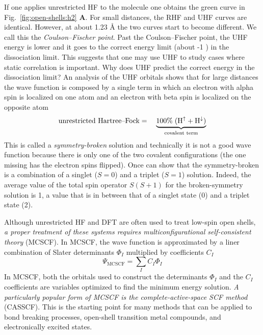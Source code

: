 \documentclass[../Main/notes.tex]{subfiles}
\begin{document}
If one applies unrestricted HF to the  molecule one obtains the green curve in Fig.~\ref{fig:open-shells:h2} \textbf{A}.
For small  distances, the RHF and UHF curves are identical.
However, at about 1.23 \AA{} the two curves start to become different.
We call this the \emph{Coulson--Fischer point}.
Past the Coulson--Fischer point, the UHF energy is lower and it goes to the correct energy limit (about -1 \Eh) in the dissociation limit.
This suggests that one may use UHF to study cases where static correlation is important.
Why does UHF predict the correct energy in the dissociation limit?
An analysis of the UHF orbitals shows that for large  distances the wave function is composed by a single term in which an electron with alpha spin is localized on one atom and an electron with beta spin is localized on the opposite atom 
\begin{equation}
\text{unrestricted Hartree--Fock} = \quad \underbrace{100\% \; (\ce{H}^{\uparrow} + \ce{H}^{\downarrow}) }_{\text{covalent term}}
\end{equation}
This is called a \emph{symmetry-broken} solution and technically it is not a good wave function because there is only one of the two covalent configurations (the one missing has the electron spins flipped).
Once can show that the symmetry-broken is a combination of a singlet ($S = 0$) and a triplet ($S = 1$) solution.
Indeed, the average value of the total spin operator $S(S+1)$ for the broken-symmetry solution is 1, a value that is in between that of a singlet state (0) and a triplet state (2).

Although unrestricted HF and DFT are often used to treat low-spin open shells, \emph{a proper treatment of these systems requires  multiconfigurational self-consistent theory} (MCSCF).
In MCSCF, the wave function is approximated by a liner combination of Slater determinants $\Phi_{I}$ multiplied by coefficients $C_I$
\begin{equation}
\Psi_{\text{MCSCF}} = \sum_I C_I \Phi_{I}
\end{equation}
In MCSCF, both the orbitals used to construct the determinants $\Phi_{I}$ and the $C_I$ coefficients are variables optimized to find the minimum   energy solution.
\emph{A particularly popular form of MCSCF is the complete-active-space SCF method} (CASSCF). This is the starting point for many methods that can be applied to bond breaking processes, open-shell transition metal compounds, and electronically excited states.
\end{document}
